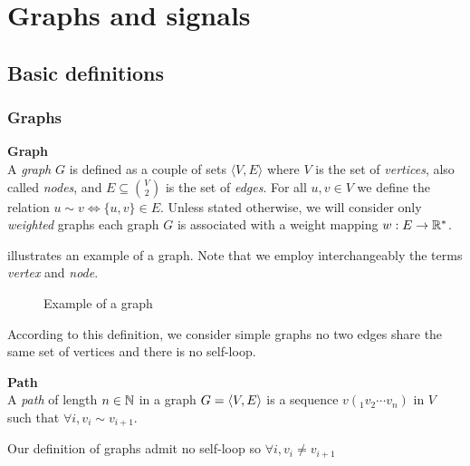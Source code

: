 \section{Graphs and signals}

\subsection{Basic definitions}

\subsubsection{Graphs}

\begin{definition}\textbf{Graph}\\
A \emph{graph} $G$ is defined as a couple of sets $\langle V,E \rangle$ where $V$ is the set of \emph{vertices}, also called \emph{nodes}, and $E \subseteq\binom{V}{2}$ is the set of \emph{edges}. For all $u, v \in V$ we define the relation $u \sim v \Leftrightarrow \{u,v\} \in E$. Unless stated otherwise, we will consider only \emph{weighted} graphs \ie each graph $G$ is associated with a weight mapping $w: E \rightarrow \mathbb{R}^*$.
\end{definition}

 illustrates an example of a graph. Note that we employ interchangeably the terms \emph{vertex} and \emph{node}.

\begin{figure}[H]
\centering
{}
\caption{Example of a graph}
\label{fig:graph}
\end{figure}

\begin{remark}According to this definition, we consider simple graphs \ie no two edges share the same set of vertices and there is no self-loop.
\end{remark}

\begin{definition}\textbf{Path}\\
A \emph{path} of length $n \in \mathbb{N}$ in a graph $G = \langle V, E \rangle$ is a sequence $v(_1 v_2 \cdots v_n)$ in $V$ such that $\forall i, v_i \sim v_{i+1}$.
\label{def:path}
\end{definition}

\begin{remark}Our definition of graphs admit no self-loop so $\forall i, v_i \neq v_{i+1}$
\end{remark}

